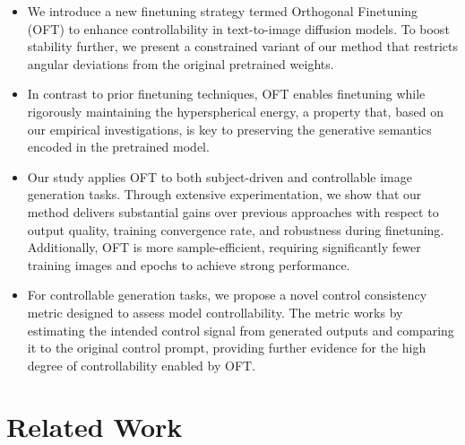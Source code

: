 \begin{itemize}[leftmargin=*,nosep]

    \item We introduce a new finetuning strategy termed Orthogonal Finetuning (OFT) to enhance controllability in text-to-image diffusion models. To boost stability further, we present a constrained variant of our method that restricts angular deviations from the original pretrained weights.
    \item In contrast to prior finetuning techniques, OFT enables finetuning while rigorously maintaining the hyperspherical energy, a property that, based on our empirical investigations, is key to preserving the generative semantics encoded in the pretrained model.
    \item Our study applies OFT to both subject-driven and controllable image generation tasks. Through extensive experimentation, we show that our method delivers substantial gains over previous approaches with respect to output quality, training convergence rate, and robustness during finetuning. Additionally, OFT is more sample-efficient, requiring significantly fewer training images and epochs to achieve strong performance.
    \item For controllable generation tasks, we propose a novel control consistency metric designed to assess model controllability. The metric works by estimating the intended control signal from generated outputs and comparing it to the original control prompt, providing further evidence for the high degree of controllability enabled by OFT.
\end{itemize}

\section{Related Work}

